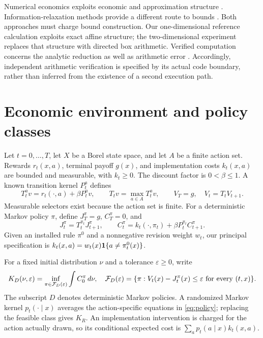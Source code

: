 Numerical economics exploits economic and approximation structure \citep{Judd1998,BrummScheidegger2017}. Information-relaxation methods provide a different route to bounds \citep{BrownSmithSun2010,BrownSmith2014}. Both approaches must charge bound construction. Our one-dimensional reference calculation exploits exact affine structure; the two-dimensional experiment replaces that structure with directed box arithmetic. Verified computation concerns the analytic reduction as well as arithmetic error \citep{Rump2010}. Accordingly, independent arithmetic verification is specified by its actual code boundary, rather than inferred from the existence of a second execution path.

\section{Economic environment and policy classes}\label{sec:model}
Let $t=0,\ldots,T$, let $X$ be a Borel state space, and let $A$ be a finite action set. Rewards $r_t(x,a)$, terminal payoff $g(x)$, and implementation costs $k_t(x,a)$ are bounded and measurable, with $k_t\geq0$. The discount factor is $0<\beta\leq1$. A known transition kernel $P_t^a$ defines
\begin{equation}\label{eq:operators}
 T_t^a v=r_t(\cdot,a)+\beta P_t^a v,
 \qquad T_t v=\max_{a\in A}T_t^a v,
 \qquad V_T=g,\quad V_t=T_tV_{t+1}.
\end{equation}
Measurable selectors exist because the action set is finite. For a deterministic Markov policy $\pi$, define $J_T^\pi=g$, $C_T^\pi=0$, and
\begin{equation}\label{eq:policy}
 J_t^\pi=T_t^{\pi_t}J_{t+1}^\pi,
 \qquad C_t^\pi=k_t(\cdot,\pi_t)+\beta P_t^{\pi_t}C_{t+1}^\pi.
\end{equation}
Given an installed rule $\pi^0$ and a nonnegative revision weight $w_t$, our principal specification is $k_t(x,a)=w_t(x)\mathbf 1\{a\ne\pi_t^0(x)\}$.

For a fixed initial distribution $\nu$ and a tolerance $\varepsilon\geq0$, write
\begin{equation}\label{eq:target}
 K_D(\nu,\varepsilon)=\inf_{\pi\in\mathcal F_D(\varepsilon)}\int C_0^\pi\,d\nu,
 \quad
 \mathcal F_D(\varepsilon)=\{\pi:V_t(x)-J_t^\pi(x)\leq\varepsilon\ \text{for every }(t,x)\}.
\end{equation}
The subscript $D$ denotes deterministic Markov policies. A randomized Markov kernel $p_t(\cdot\mid x)$ averages the action-specific equations in \eqref{eq:policy}; replacing the feasible class gives $K_R$. An implementation intervention is charged for the action actually drawn, so its conditional expected cost is $\sum_a p_t(a\mid x)k_t(x,a)$.

